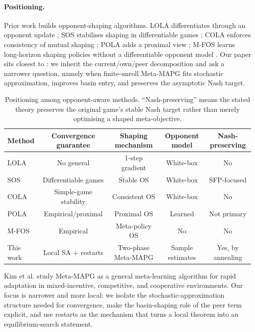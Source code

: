 \documentclass{article}
\theoremstyle{plain}
\theoremstyle{definition}
\theoremstyle{remark}
\begin{document}
\paragraph{Positioning.}
Prior work builds opponent-shaping algorithms. LOLA differentiates through an opponent update \citep{foerster2018lola}; SOS stabilises shaping in differentiable games \citep{letcher2019stable}; COLA enforces consistency of mutual shaping \citep{willi2022cola}; POLA adds a proximal view \citep{zhao2022pola}; M-FOS learns long-horizon shaping policies without a differentiable opponent model \citep{lu2022mfos}. Our paper sits closest to \citet{kim2021meta}: we inherit the current/own/peer decomposition and ask a narrower question, namely when finite-unroll Meta-MAPG fits stochastic approximation, improves basin entry, and preserves the asymptotic Nash target.

\begin{table}[t]
  \centering
  \caption{Positioning among opponent-aware methods. ``Nash-preserving'' means the stated theory preserves the original game's stable Nash target rather than merely optimising a shaped meta-objective.}
  \label{tab:related}
  \begin{tabular*}{\textwidth}{@{\extracolsep{\fill}}lcccc@{}}
  \toprule
  Method & Convergence guarantee & Shaping mechanism & Opponent model & Nash-preserving\\
  \midrule
  LOLA & No general & 1-step gradient & White-box & No\\
  SOS & Differentiable games & Stable OS & White-box & SFP-focused\\
  COLA & Simple-game stability & Consistent OS & White-box & No\\
  POLA & Empirical/proximal & Proximal OS & Learned & Not primary\\
  M-FOS & Empirical & Meta-policy OS & No & No\\
  This work & Local SA + restarts & Two-phase Meta-MAPG & Sample estimates & Yes, by annealing\\
  \bottomrule
  \end{tabular*}
\end{table}

Kim et al. study Meta-MAPG as a general meta-learning algorithm for rapid adaptation in mixed-incentive, competitive, and cooperative environments. Our focus is narrower and more local: we isolate the stochastic-approximation structure needed for convergence, make the basin-shaping role of the peer term explicit, and use restarts as the mechanism that turns a local theorem into an equilibrium-search statement.
\end{document}
